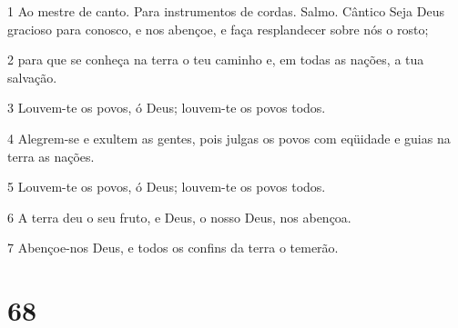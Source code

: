 \par 1 Ao mestre de canto. Para instrumentos de cordas. Salmo. Cântico Seja Deus gracioso para conosco, e nos abençoe, e faça resplandecer sobre nós o rosto;
\par 2 para que se conheça na terra o teu caminho e, em todas as nações, a tua salvação.
\par 3 Louvem-te os povos, ó Deus; louvem-te os povos todos.
\par 4 Alegrem-se e exultem as gentes, pois julgas os povos com eqüidade e guias na terra as nações.
\par 5 Louvem-te os povos, ó Deus; louvem-te os povos todos.
\par 6 A terra deu o seu fruto, e Deus, o nosso Deus, nos abençoa.
\par 7 Abençoe-nos Deus, e todos os confins da terra o temerão.

\chapter{68}

